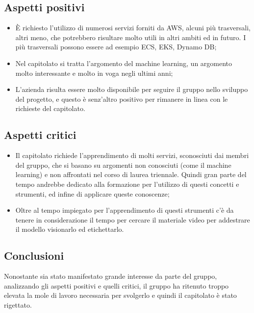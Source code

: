 \subsection{Aspetti positivi}
\begin{itemize}
\item \`E richiesto l'utilizzo di numerosi servizi forniti da AWS, alcuni più trasversali, altri meno, che potrebbero risultare molto utili in altri ambiti ed in futuro. I più trasversali possono essere ad esempio ECS, EKS, Dynamo DB;
\item Nel capitolato si tratta l'argomento del machine learning, un argomento molto interessante e molto in voga negli ultimi anni;
\item L'azienda risulta essere molto disponibile per seguire il gruppo nello sviluppo del progetto, e questo è senz'altro positivo per rimanere in linea con le richieste del capitolato.
\end{itemize}

\subsection{Aspetti critici}
\begin{itemize}
\item Il capitolato richiede l'apprendimento di molti servizi, sconosciuti dai membri del gruppo, che si basano su argomenti non conosciuti (come il machine learning) e non affrontati nel corso di laurea triennale. Quindi gran parte del tempo andrebbe dedicato alla formazione per l'utilizzo di questi concetti e strumenti, ed infine di applicare queste conoscenze;
\item Oltre al tempo impiegato per l'apprendimento di questi strumenti c'è da tenere in considerazione il tempo per cercare il materiale video per addestrare il modello visionarlo ed etichettarlo.
\end{itemize}

\subsection{Conclusioni}
Nonostante sia stato manifestato grande interesse da parte del gruppo, analizzando gli aspetti positivi e quelli critici, il gruppo ha ritenuto troppo elevata la mole di lavoro necessaria per svolgerlo e quindi il capitolato è stato rigettato.

